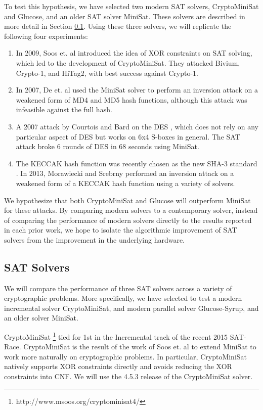 To test this hypothesis, we have selected two modern SAT solvers, CryptoMiniSat and Glucose, and an older SAT solver MiniSat. These solvers are described in more detail in Section \ref{sec:existingtools}. Using these three solvers, we will replicate the following four experiments:
\begin{enumerate}
	\item In 2009, Soos et. al \cite{SNC09} introduced the idea of XOR constraints on SAT solving, which led to the development of CryptoMiniSat. They attacked Bivium, Crypto-1, and HiTag2, with best success against Crypto-1.
	
	\item In 2007, De et. al \cite{DKV07} used the MiniSat solver to perform an inversion attack on a weakened form of MD4 and MD5 hash functions, although this attack was infeasible against the full hash.
	
	\item A 2007 attack by Courtois and Bard on the DES \cite{CB07}, which does not rely on any particular aspect of DES but works on 6x4 S-boxes in general. The SAT attack broke 6 rounds of DES in 68 seconds using MiniSat.
	
	\item The KECCAK hash function was recently chosen as the new SHA-3 standard \cite{USDOC15}. In 2013, Morawiecki and Srebrny \cite{MS13} performed an inversion attack on a weakened form of a {KECCAK} hash function using a variety of solvers. 
\end{enumerate}

We hypothesize that both CryptoMiniSat and Glucose will outperform MiniSat for these attacks. By comparing modern solvers to a contemporary solver, instead of comparing the performance of modern solvers directly to the results reported in each prior work, we hope to isolate the algorithmic improvement of SAT solvers from the improvement in the underlying hardware.

\subsection{SAT Solvers}
\label{sec:existingtools}

We will compare the performance of three SAT solvers across a variety of cryptographic problems. More specifically, we have selected to test a modern incremental solver CryptoMiniSat, and modern parallel solver Glucose-Syrup, and an older solver MiniSat.

CryptoMiniSat \footnote{http://www.msoos.org/cryptominisat4/} tied for 1st in the Incremental track of the recent 2015 SAT-Race. CryptoMiniSat is the result of the work of Soos et. al \cite{SNC09} to extend MiniSat to work more naturally on cryptographic problems.  In particular, CryptoMiniSat natively supports XOR constraints directly and avoids reducing the XOR constraints into CNF. We will use the 4.5.3 release of the CryptoMiniSat solver.

